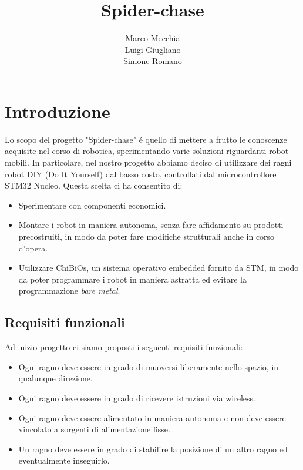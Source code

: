 \documentclass [11pt ,a4paper ,twoside ]{article}
\title{\textbf{Spider-chase}}
\author{Marco Mecchia\\
		Luigi Giugliano\\
		Simone Romano}
\date{}
\begin{document}
\maketitle

\tableofcontents

\cleardoublepage

\section{Introduzione}

Lo scopo del progetto "Spider-chase" \'e quello di mettere a frutto le conoscenze acquisite nel corso di robotica, sperimentando varie soluzioni riguardanti robot mobili. In particolare, nel nostro progetto abbiamo deciso di utilizzare dei ragni robot DIY (Do It Yourself) dal basso costo, controllati dal microcontrollore STM32 Nucleo. Questa scelta ci ha consentito di:

\begin{itemize}
\item Sperimentare con componenti economici.
\item Montare i robot in maniera autonoma, senza fare affidamento su prodotti precostruiti, in modo da poter fare modifiche strutturali anche in corso d'opera.
\item Utilizzare ChiBiOs, un sistema operativo embedded fornito da STM, in modo da poter programmare i robot in maniera astratta ed evitare la programmazione \textit{bare metal}.
\end{itemize}

\subsection{Requisiti funzionali}
Ad inizio progetto ci siamo proposti i seguenti requisiti funzionali:
\begin{itemize}
\item Ogni ragno deve essere in grado di muoversi liberamente nello spazio, in qualunque direzione.
\item Ogni ragno deve essere in grado di ricevere istruzioni via wireless.
\item Ogni ragno deve essere alimentato in maniera autonoma e non deve essere vincolato a sorgenti di alimentazione fisse.
\item Un ragno deve essere in grado di stabilire la posizione di un altro ragno ed eventualmente inseguirlo.
\end{itemize}
\end{document}
